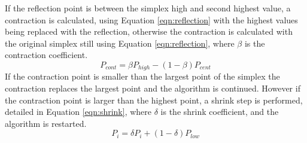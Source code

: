 If the reflection point is between the simplex high and second highest value, a contraction is calculated, using Equation \ref{eqn:reflection} with the highest values being replaced with the reflection, otherwise the contraction is calculated with the original simplex still using Equation \ref{eqn:reflection}, where $\beta$ is the contraction coefficient.
	\begin{equation}\label{eqn:contraction}
		P_{cont} = \beta P_{high} - (1 - \beta) P_{cent}	
	\end{equation}
If the contraction point is smaller than the largest point of the simplex the contraction replaces the largest point and the algorithm is continued.
However if the contraction point is larger than the highest point, a shrink step is performed, detailed in Equation \ref{eqn:shrink}, where $\delta$ is the shrink coefficient, and the algorithm is restarted.
	\begin{equation}\label{eqn:shrink}
		P_{i} = \delta P_{i} + (1 - \delta) P_{low}
	\end{equation}